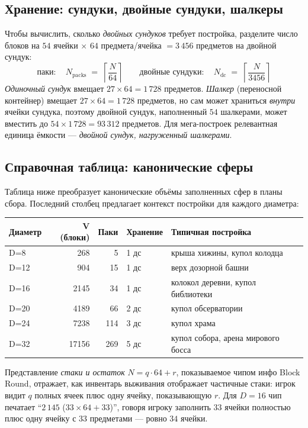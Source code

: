 \documentclass[12pt,a4paper]{scrartcl}
\begin{document}
\subsection{Хранение: сундуки, двойные сундуки, шалкеры}
Чтобы вычислить, сколько \emph{двойных сундуков} требует постройка, разделите число блоков на $54$ ячейки $\times$ $64$ предмета/ячейка $= 3\,456$ предметов на двойной сундук:
\[
\text{паки}:\quad N_{\mathrm{packs}} \;=\; \left\lceil \dfrac{N}{64} \right\rceil
\qquad
\text{двойные сундуки}:\quad N_{\mathrm{dc}} \;=\; \left\lceil \dfrac{N}{3456} \right\rceil
\]
\emph{Одиночный сундук} вмещает $27 \times 64 = 1\,728$ предметов. \emph{Шалкер} (переносной контейнер) вмещает $27 \times 64 = 1\,728$ предметов, но сам может храниться \emph{внутри} ячейки сундука, поэтому двойной сундук, наполненный $54$ шалкерами, может вместить до $54 \times 1\,728 = 93\,312$ предметов. Для мега-построек релевантная единица ёмкости — \emph{двойной сундук, нагруженный шалкерами}.

\subsection{Справочная таблица: канонические сферы}
Таблица ниже преобразует канонические объёмы заполненных сфер в планы сбора. Последний столбец предлагает контекст постройки для каждого диаметра:
\nopagebreak

\vspace{0.4em}
\begin{center}
\small
\begin{tabularx}{\textwidth}{@{}lrrlX@{}}
\toprule
\textbf{Диаметр} & \textbf{V (блоки)} & \textbf{Паки} & \textbf{Хранение} & \textbf{Типичная постройка} \\
\midrule
D=8   &   268 &  5  &  1 дс & крыша хижины, купол колодца  \\
D=12  &   904 & 15  &  1 дс & верх дозорной башни \\
D=16  &  2145 & 34  &  1 дс & колокол деревни, купол библиотеки \\
D=20  &  4189 & 66  &  2 дс & купол обсерватории \\
D=24  &  7238 & 114 &  3 дс & купол храма \\
D=32  & 17156 & 269 &  5 дс & купол собора, арена мирового босса \\
\bottomrule
\end{tabularx}
\end{center}

Представление \emph{стаки и остаток} $N = q \cdot 64 + r$, показываемое чипом инфо Block Round, отражает, как инвентарь выживания отображает частичные стаки: игрок видит $q$ полных ячеек плюс одну ячейку, показывающую $r$. Для $D=16$ чип печатает \enquote{$2\,145$ ($33 \times 64 + 33$)}, говоря игроку заполнить $33$ ячейки полностью плюс одну ячейку с $33$ предметами — ровно $34$ ячейки.
\end{document}
